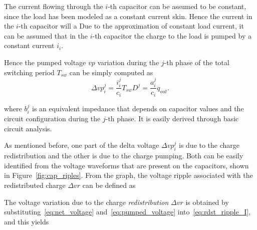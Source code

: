 The current flowing through the $i$-th capacitor can be assumed to be constant, since the load has been modeled as a constant current skin. Hence the current in the $i$-th capacitor will a
Due to the approximation of constant load current, it can be assumed that in the $i$-th capacitor the charge to the load is pumped by a constant current $i_i$.

Hence the pumped voltage $vp$ variation during the $j$-th phase of the total switching period $T_{sw}$ can be simply computed as
\begin{equation}
\Delta {vp}^j_i  = \frac{i_i^j}{c_i} T_{sw} D^j = \frac{a_i ^j }{c_i} q_{out} .
\label{eq:pumped_voltage}
\end{equation}

where $b_i^j$ is an equivalent impedance that depends on capacitor values and the circuit configuration during the $j$-th phase. It is easily derived through basic circuit analysis.

As mentioned before, one part of the delta voltage $\Delta vp_i^j$ is due to the charge redistribution and the other is due to the charge pumping. Both can be easily identified from the voltage waveforms that are present on the capacitors, shown in Figure~\ref{fig:cap_riples}. From the graph, the voltage ripple associated with the redistributed charge $\Delta vr$ can be defined as

The voltage variation due to the charge \emph{redistribution} $\Delta vr$  is obtained by substituting~\ref{eq:net_voltage} and~\ref{eq:pumped_voltage} into~\ref{eq:rdst_ripple_I}, and this yields




